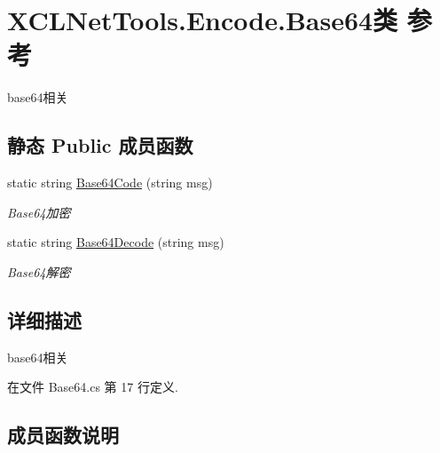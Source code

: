 \hypertarget{class_x_c_l_net_tools_1_1_encode_1_1_base64}{}\section{X\+C\+L\+Net\+Tools.\+Encode.\+Base64类 参考}
\label{class_x_c_l_net_tools_1_1_encode_1_1_base64}


base64相关  


\subsection*{静态 Public 成员函数}
\begin{DoxyCompactItemize}
\item 
static string \hyperlink{class_x_c_l_net_tools_1_1_encode_1_1_base64_a628c4b09c3625b12f0d4f76d3a16cf00}{Base64\+Code} (string msg)
\begin{DoxyCompactList}\small\item\em Base64加密 \end{DoxyCompactList}\item 
static string \hyperlink{class_x_c_l_net_tools_1_1_encode_1_1_base64_af51bea13594029540c9e9abf3ce1bfb2}{Base64\+Decode} (string msg)
\begin{DoxyCompactList}\small\item\em Base64解密 \end{DoxyCompactList}\end{DoxyCompactItemize}


\subsection{详细描述}
base64相关 



在文件 Base64.\+cs 第 17 行定义.



\subsection{成员函数说明}
\mbox{\label{class_x_c_l_net_tools_1_1_encode_1_1_base64_a628c4b09c3625b12f0d4f76d3a16cf00}} 
